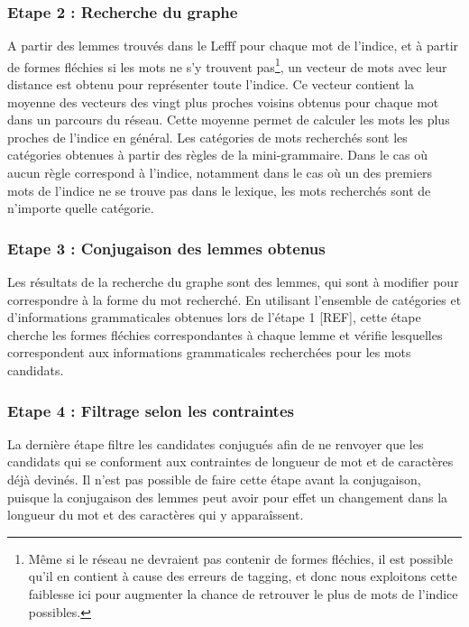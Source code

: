 \subsubsection{Etape 2 : Recherche du graphe}

A partir des lemmes trouvés dans le Lefff pour chaque mot de l'indice, et à 
partir de formes fléchies si les mots ne s'y trouvent pas\footnote{Même si le 
réseau ne devraient pas contenir de formes fléchies, il est possible qu'il en 
contient à cause des erreurs de tagging, et donc nous exploitons cette faiblesse 
ici pour augmenter la chance de retrouver le plus de mots de l'indice 
possibles.}, un vecteur de mots avec leur distance est obtenu pour représenter 
toute l'indice. Ce vecteur contient la moyenne des vecteurs des vingt plus 
proches voisins obtenus pour chaque mot dans un parcours du réseau. Cette 
moyenne permet de calculer les mots les plus proches de l'indice en général. Les 
catégories de mots recherchés sont les catégories obtenues à partir des règles 
de la mini-grammaire. Dans le cas où aucun règle correspond à l'indice, 
notamment dans le cas où un des premiers mots de l'indice ne se trouve pas dans 
le lexique, les mots recherchés sont de n'importe quelle catégorie.

\subsubsection{Etape 3 : Conjugaison des lemmes obtenus}

Les résultats de la recherche du graphe sont des lemmes, qui sont à modifier 
pour correspondre à la forme du mot recherché. En utilisant l'ensemble de 
catégories et d'informations grammaticales obtenues lors de l'étape 1 [REF], 
cette étape cherche les formes fléchies correspondantes à chaque lemme et 
vérifie lesquelles correspondent aux informations grammaticales recherchées pour 
les mots candidats.

\subsubsection{Etape 4 : Filtrage selon les contraintes}

La dernière étape filtre les candidates conjugués afin de ne renvoyer que les 
candidats qui se conforment aux contraintes de longueur de mot et de caractères 
déjà devinés. Il n'est pas possible de faire cette étape avant la conjugaison, 
puisque la conjugaison des lemmes peut avoir pour effet un changement dans la 
longueur du mot et des caractères qui y apparaîssent.

